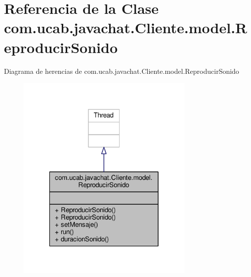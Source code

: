\hypertarget{classcom_1_1ucab_1_1javachat_1_1_cliente_1_1model_1_1_reproducir_sonido}{\section{Referencia de la Clase com.\-ucab.\-javachat.\-Cliente.\-model.\-Reproducir\-Sonido}
\label{classcom_1_1ucab_1_1javachat_1_1_cliente_1_1model_1_1_reproducir_sonido}
}


Diagrama de herencias de com.\-ucab.\-javachat.\-Cliente.\-model.\-Reproducir\-Sonido
\nopagebreak
\begin{figure}[H]
\begin{center}
\leavevmode
\includegraphics[width=244pt]{d7/d0d/classcom_1_1ucab_1_1javachat_1_1_cliente_1_1model_1_1_reproducir_sonido__inherit__graph}
\end{center}
\end{figure}


